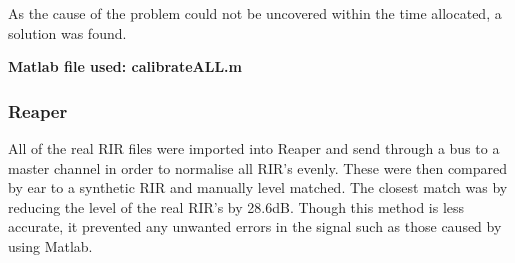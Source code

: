 \documentclass[../../main.tex]{subfiles}
\begin{document}
	As the cause of the problem could not be uncovered within the time allocated, a solution was found.

	\textbf{Matlab file used: calibrateALL.m}

	\subsubsection{Reaper}

		All of the real \ac{RIR} files were imported into Reaper and send through a bus to a master channel in order to normalise all \ac{RIR}'s evenly. These were then compared by ear to a synthetic \ac{RIR} and manually level matched. The closest match was by reducing the level of the real \ac{RIR}'s by 28.6dB. Though this method is less accurate, it prevented any unwanted errors in the signal such as those caused by using Matlab.





\end{document}
